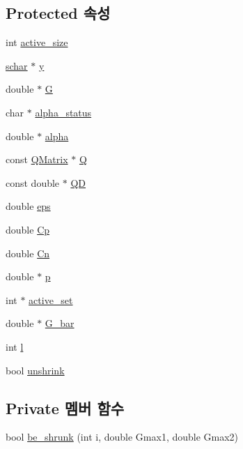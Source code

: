 \subsection*{Protected 속성}
\begin{DoxyCompactItemize}
\item 
int \hyperlink{class_solver_a06ba1b87b3749cc545e573151b7beca0}{active\+\_\+size}
\item 
\hyperlink{svm_8cpp_a0fd9ce9d735064461bebfe6037026093}{schar} $\ast$ \hyperlink{class_solver_a3acc1043d06dedf87f054ff3eea5c426}{y}
\item 
double $\ast$ \hyperlink{class_solver_ad8ab27068f2e045591970aae1201afe9}{G}
\item 
char $\ast$ \hyperlink{class_solver_a9fe653e04c43956d5fb86635651b0003}{alpha\+\_\+status}
\item 
double $\ast$ \hyperlink{class_solver_a00d7a7cefa2504d41c7db6cd7cc6b428}{alpha}
\item 
const \hyperlink{class_q_matrix}{Q\+Matrix} $\ast$ \hyperlink{class_solver_a2d3461718f0570bdc47f5dfb31d61e0a}{Q}
\item 
const double $\ast$ \hyperlink{class_solver_a7c7b7b1207983543855165e8eb249f2a}{Q\+D}
\item 
double \hyperlink{class_solver_a718333cc2c1d40abf9c292a788cba1e5}{eps}
\item 
double \hyperlink{class_solver_a2e45dbea8be469bf8247e14768549dd5}{Cp}
\item 
double \hyperlink{class_solver_a38d741d194839fb445f982dd78e0b97b}{Cn}
\item 
double $\ast$ \hyperlink{class_solver_a882cce072f56679880d409e3e73f7ae8}{p}
\item 
int $\ast$ \hyperlink{class_solver_a6382277606a9b3df3d2f0ac947e1cde3}{active\+\_\+set}
\item 
double $\ast$ \hyperlink{class_solver_a89e58cf39a0415c9032b8ec2f4575dcc}{G\+\_\+bar}
\item 
int \hyperlink{class_solver_a88832d45b6de977b1cbb2afd4c0e494c}{l}
\item 
bool \hyperlink{class_solver_a62ded1c184aeb28f8dee04eb4a10530a}{unshrink}
\end{DoxyCompactItemize}
\subsection*{Private 멤버 함수}
\begin{DoxyCompactItemize}
\item 
bool \hyperlink{class_solver_a7f4c3abc7cad2864d85bbe41e4d7da03}{be\+\_\+shrunk} (int i, double Gmax1, double Gmax2)
\end{DoxyCompactItemize}


